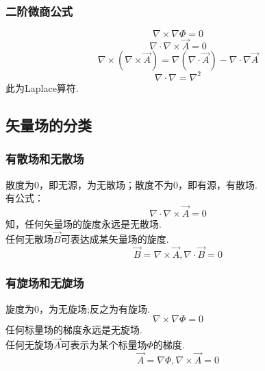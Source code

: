 \subsubsection{二阶微商公式}
\begin{equation}\label{VecAnl_eq20}
\nabla\times\nabla\Phi=0
\end{equation}
\begin{equation}\label{VecAnl_eq21}
\nabla\cdot\nabla\times\vec{A}=0
\end{equation}
\begin{equation}\label{VecAnl_eq22}
\nabla\times(\nabla\times\vec{A})=\nabla(\nabla\cdot\vec{A})-\nabla\cdot\nabla\vec{A}
\end{equation}
\begin{equation}\label{VecAnl_eq23}
\nabla\cdot\nabla=\nabla^2
\end{equation}
此为Laplace算符.

\subsection{矢量场的分类}
\subsubsection{有散场和无散场}
散度为0，即无源，为无散场；散度不为0，即有源，有散场.\\
有公式：
\begin{equation}\label{VecAnl_eq24}
\nabla\cdot\nabla\times\vec{A}=0
\end{equation}
知，任何矢量场的旋度永远是无散场.\\
任何无散场$\vec{B}$可表达成某矢量场的旋度.
\begin{equation}\label{VecAnl_eq25}
\vec{B}=\nabla\times\vec{A} ,\nabla\cdot\vec{B}=0
\end{equation}
\subsubsection{有旋场和无旋场}
旋度为0，为无旋场;反之为有旋场.
\begin{equation}\label{VecAnl_eq26}
\nabla\times\nabla\Phi=0
\end{equation}
任何标量场的梯度永远是无旋场.\\
任何无旋场$\vec{A}$可表示为某个标量场$\Phi$的梯度.
\begin{equation}\label{VecAnl_eq27}
\vec{A}=\nabla\Phi,\nabla\times\vec{A}=0
\end{equation}

